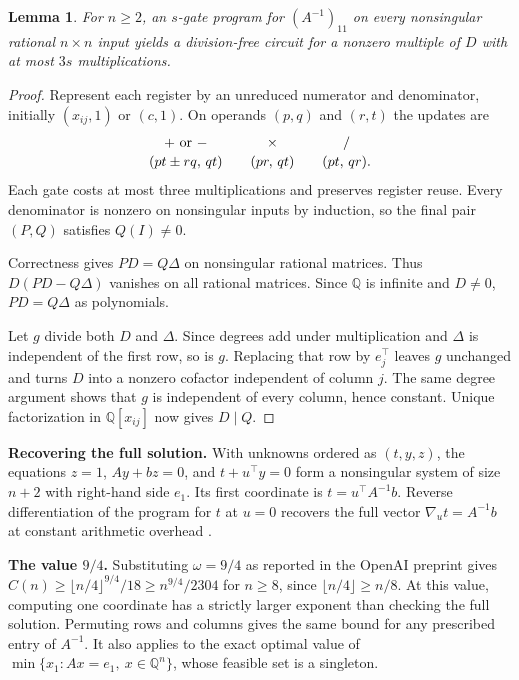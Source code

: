\documentclass[11pt,letterpaper]{article}
\newtheorem{lemma}[theorem]{Lemma}
\newcommand{\Q}{\mathbb{Q}}
\newcommand{\floor}[1]{\lfloor #1\rfloor}
\begin{document}
\begin{lemma}\label{lem:denominator}
For \(n\ge2\), an \(s\)-gate program for \((A^{-1})_{11}\) on every
nonsingular rational \(n\times n\) input yields a division-free circuit
for a nonzero multiple of \(D\) with at most \(3s\) multiplications.
\end{lemma}

\begin{proof}
Represent each register by an unreduced numerator and denominator, initially
\((x_{ij},1)\) or \((c,1)\). On operands \((p,q)\) and \((r,t)\) the updates are
\[
\begin{array}{c@{\qquad}c@{\qquad}c}
  +\text{ or }- & \times & /\\[2pt]
  (pt\pm rq,\,qt) & (pr,\,qt) & (pt,\,qr).
\end{array}
\]
Each gate costs at most three multiplications and preserves register reuse.
Every denominator is nonzero on nonsingular inputs by induction, so the
final pair \((P,Q)\) satisfies \(Q(I)\ne0\).

Correctness gives \(PD=Q\Delta\) on nonsingular rational matrices. Thus
\(D(PD-Q\Delta)\) vanishes on all rational matrices. Since \(\Q\) is infinite
and \(D\ne0\), \(PD=Q\Delta\) as polynomials.

Let \(g\) divide both \(D\) and \(\Delta\). Since degrees add under
multiplication and \(\Delta\) is independent of the first row, so is \(g\).
Replacing that row by \(e_j^\top\) leaves \(g\) unchanged and turns \(D\)
into a nonzero cofactor independent of column \(j\). The same degree
argument shows that \(g\) is independent of every column, hence constant.
Unique factorization in \(\Q[x_{ij}]\) now gives \(D\mid Q\).
\end{proof}

\medskip\noindent\textbf{Recovering the full solution.}\enspace
With unknowns ordered as \((t,y,z)\), the equations \(z=1\), \(Ay+bz=0\),
and \(t+u^\top y=0\) form a nonsingular system of size \(n+2\) with right-hand
side \(e_1\). Its first coordinate is \(t=u^\top A^{-1}b\). Reverse
differentiation of the program for \(t\) at \(u=0\) recovers the full vector
\(\nabla_u t=A^{-1}b\) at constant arithmetic overhead \cite[Theorem~2]{baur}.

\medskip\noindent\textbf{The value \(9/4\).}\enspace
Substituting \(\omega=9/4\) as reported in the OpenAI preprint \cite[Theorem~1.1]{openai}
gives \(C(n)\ge \floor{n/4}^{9/4}/18 \ge n^{9/4}/2304\) for \(n\ge8\),
since \(\floor{n/4}\ge n/8\). At this value, computing one coordinate
has a strictly larger exponent than checking the full solution.
Permuting rows and columns gives the same bound for any prescribed entry
of \(A^{-1}\). It also applies to the exact optimal value of
\(\min\{x_1:Ax=e_1,\ x\in\Q^n\}\), whose feasible set is a singleton.
\end{document}
